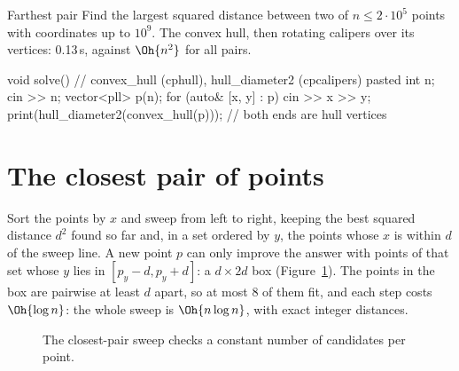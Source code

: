 
\begin{problem}{Farthest pair}
Find the largest squared distance between two of $n \le 2 \cdot 10^5$ points with coordinates up to $10^9$.
\solution The convex hull, then rotating calipers over its vertices: 0.13\,s, against $\Oh{n^2}$ for all pairs.
\end{problem}

\begin{code}
void solve() {  // convex_hull (cphull), hull_diameter2 (cpcalipers) pasted
    int n;
    cin >> n;
    vector<pll> p(n);
    for (auto& [x, y] : p) cin >> x >> y;
    print(hull_diameter2(convex_hull(p)));  // both ends are hull vertices
}
\end{code}

\section[The closest pair of points]{The closest pair of points \hfill \plat}\label{sec:closest}

Sort the points by $x$ and sweep from left to right, keeping the best squared distance $d^2$ found so far and, in a set ordered by $y$,
the points whose $x$ is within $d$ of the sweep line. A new point $p$ can only improve the answer with points of that set whose $y$ lies in
$[p_y - d, p_y + d]$: a $d \times 2d$ box (Figure~\ref{fig:closest}). The points in the box are pairwise at least $d$ apart, so at most 8
of them fit, and each step costs $\Oh{\log n}$: the whole sweep is $\Oh{n \log n}$, with exact integer distances.

\begin{figure}[htbp]
\centering
{}
\caption{The closest-pair sweep checks a constant number of candidates per point.}
\label{fig:closest}
\end{figure}

